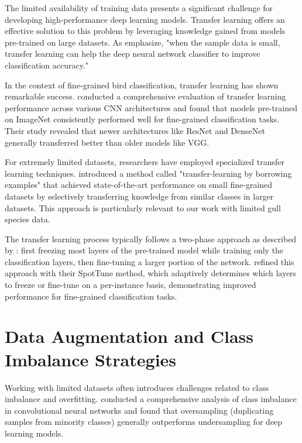 The limited availability of training data presents a significant challenge for developing high-performance deep learning models. Transfer learning offers an effective solution to this problem by leveraging knowledge gained from models pre-trained on large datasets. As \cite{tan2018survey} emphasize, "when the sample data is small, transfer learning can help the deep neural network classifier to improve classification accuracy."


In the context of fine-grained bird classification, transfer learning has shown remarkable success. \cite{kornblith2019better} conducted a comprehensive evaluation of transfer learning performance across various CNN architectures and found that models pre-trained on ImageNet consistently performed well for fine-grained classification tasks. Their study revealed that newer architectures like ResNet and DenseNet generally transferred better than older models like VGG.


For extremely limited datasets, researchers have employed specialized transfer learning techniques. \cite{cui2018large} introduced a method called "transfer-learning by borrowing examples" that achieved state-of-the-art performance on small fine-grained datasets by selectively transferring knowledge from similar classes in larger datasets. This approach is particularly relevant to our work with limited gull species data.


The transfer learning process typically follows a two-phase approach as described by \cite{zeiler2014visualizing}: first freezing most layers of the pre-trained model while training only the classification layers, then fine-tuning a larger portion of the network. \cite{guo2019spottune} refined this approach with their SpotTune method, which adaptively determines which layers to freeze or fine-tune on a per-instance basis, demonstrating improved performance for fine-grained classification tasks.


\section*{Data Augmentation and Class Imbalance Strategies}

Working with limited datasets often introduces challenges related to class imbalance and overfitting. \cite{buda2018systematic} conducted a comprehensive analysis of class imbalance in convolutional neural networks and found that oversampling (duplicating samples from minority classes) generally outperforms undersampling for deep learning models.


